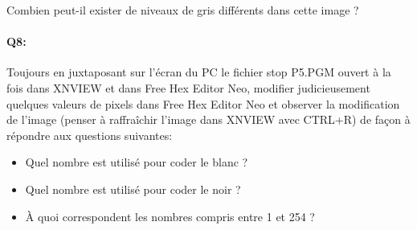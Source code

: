 \documentclass{article}
\begin{document}
Combien peut-il exister de niveaux de gris différents dans cette image ?

\vspace{1em}
\begin{Form}
	\TextField[name=r7,width=\linewidth,height=5em,multiline=true]{}
\end{Form}

\paragraph{Q8:}
Toujours en juxtaposant sur l'écran du PC le fichier \og{}stop P5.PGM\fg{} ouvert à la fois dans \og{}XNVIEW\fg{} et dans \og{}Free Hex Editor Neo\fg{}, 
modifier judicieusement quelques valeurs de pixels dans \og{}Free Hex Editor Neo\fg{} et observer la modification de l'image 
(penser à raffraîchir l'image dans \og{}XNVIEW\fg{} avec CTRL+R) de façon à répondre aux questions suivantes:
\begin{itemize}
	\item Quel nombre est utilisé pour coder le blanc ?
	\item Quel nombre est utilisé pour coder le noir ?
	\item À quoi correspondent les nombres compris entre 1 et 254 ?
\end{itemize}

\vspace{1em}
\begin{Form}
	\TextField[name=r8,width=\linewidth,height=5em,multiline=true]{}
\end{Form}
\end{document}
